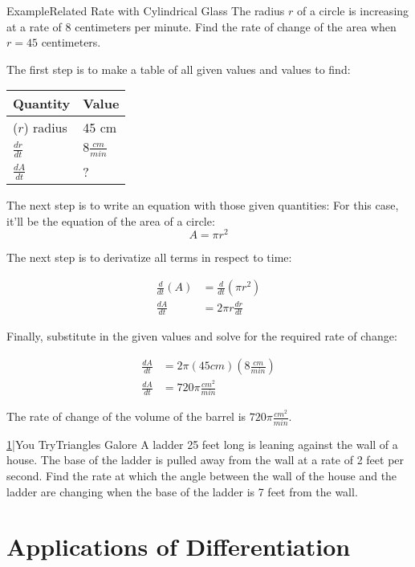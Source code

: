 \documentclass{MathNotes}
\newenvironment{example}[1]{\begin{BlueBox}{Example}{#1}}{\end{BlueBox}}
\newenvironment{practice}[2]{\begin{PurpleBox}{\texorpdfstring{#1}\Big|You Try}{#2}}{\end{PurpleBox}}
\begin{document}
\begin{example}{Related Rate with Cylindrical Glass}
The radius $r$ of a circle is increasing at a rate of 8 centimeters per
minute. Find the rate of change of the area when $r = 45$ centimeters.

The first step is to make a table of all given values and values to find:
\begin{center}
\begin{tabular}{l|l}
    Quantity & Value\\
    \hline
    ($r$) radius & 45 cm\\
    $\frac{dr}{dt}$ & $8\frac{cm}{min}$\\
    $\frac{dA}{dt}$ & ?\\
\end{tabular}
\end{center}

The next step is to write an equation with those given quantities: For this
case, it'll be the equation of the area of a circle: $$A=\pi r^2$$

The next step is to derivatize all terms in respect to time:

\begin{align*}
\frac{d}{dt}(A)&=\frac{d}{dt}(\pi r^2)\\
\frac{dA}{dt}&=2\pi r\frac{dr}{dt}
\end{align*}

Finally, substitute in the given values and solve for the required rate
of change:

\begin{align*}
\frac{dA}{dt}&=2\pi (45cm)(8\frac{cm}{min})\\
\frac{dA}{dt}&=720\pi\frac{cm^2}{min}
\end{align*}

The rate of change of the volume of the barrel is $720\pi\frac{cm^2}{min}$.
\end{example}

\begin{practice}{\hyperref[ans:2.5-1]{1}}{Triangles Galore}
\label{prac:2.5-1}
A ladder 25 feet long is leaning against the wall of a house. The base
of the ladder is pulled away from the wall at a rate of 2 feet per
second. Find the rate at which the angle between the wall of the house and the
ladder are changing when the base of the ladder is 7 feet from the wall.
\end{practice}

\section{Applications of Differentiation}
\end{document}
